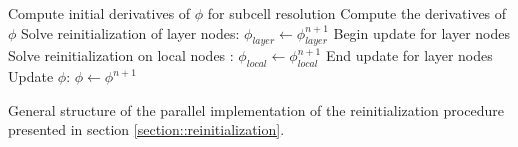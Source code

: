 \begin{algorithm}[ht!]
\begin{algorithmic}
\State Compute initial derivatives of $\phi$ for subcell resolution
	\State Compute the derivatives of $\phi$
	\State Solve reinitialization of layer nodes: $\phi_{layer} \leftarrow \phi_{layer}^{n+1}$
	\State Begin update for layer nodes
	\State Solve reinitialization on local nodes : $\phi_{local} \leftarrow \phi_{local}^{n+1}$
	\State End update for layer nodes
	\State Update $\phi$: $\phi \leftarrow \phi^{n+1}$
\EndFor
\end{algorithmic}
\caption{General structure of the parallel implementation of the reinitialization procedure presented in section \ref{section::reinitialization}.} \label{algo::reinitialization}
\end{algorithm}